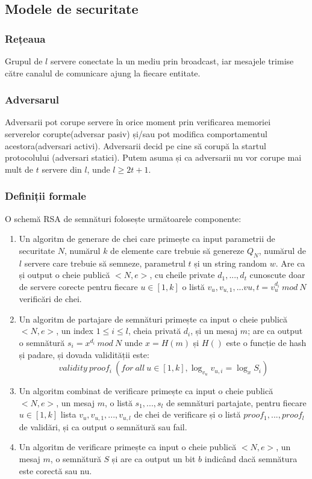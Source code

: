 \documentclass[12]{article}
\begin{document}
\subsection{Modele de securitate}
\subsubsection{Rețeaua}
Grupul de $l$ servere conectate la un mediu prin broadcast, iar mesajele trimise către canalul de comunicare ajung la fiecare entitate.
\subsubsection{Adversarul}
Adversarii pot corupe servere în orice moment prin verificarea memoriei serverelor corupte(adversar pasiv) și/sau pot modifica comportamentul acestora(adversari activi). Adversarii decid pe cine să corupă la startul protocolului (adversari statici). Putem asuma și ca adversarii nu vor corupe mai mult de $t$ servere din $l$, unde $l \geqslant 2t+1$.
\subsubsection{Definiții formale}
O schemă RSA de semnături folosește următoarele componente:
\begin{enumerate}
\item Un algoritm de generare de chei care primește ca input parametrii de securitate $N$, numărul $k$ de elemente care trebuie să genereze $Q_N$, numărul de $l$ servere care trebuie să semneze, parametrul $t$ și un string random $w$. Are ca și output o cheie publică $<N,e>$, cu cheile private $d_1,...,d_t$ cunoscute doar de servere corecte pentru fiecare $u \in [1,k]$ o listă $v_u,v_{u,1},...v{u,t}=v_{u}^{d_i} \ mod \ N$ verificări de chei. 
\item Un algoritm de partajare de semnături primește ca input o cheie publică $<N,e>$, un index $ 1\leqslant i \leqslant l$, cheia privată $d_i$, și un mesaj $m$; are ca output o semnătură $s_i = x^{d_i} \ mod \ N$ unde $x=H(m)$ și $H()$ este o funcție de hash și padare, și dovada validității este:
$$ validity \ proof_i \ (for \ all \ u \in [1,k], \log_{v_u} v_{u,i}=\log_x S_i)$$
\item Un algoritm combinat de verificare primește ca input o cheie publică $<N,e>$, un mesaj $m$, o listă $s_1,...,s_l$ de semnături partajate, pentru fiecare $u \in [1,k]$ lista $v_u,v_{u,1},...,v_{u,l}$ de chei de verificare și o listă $proof_1,...,proof_l$ de validări, și ca output o semnătură sau fail.
\item Un algoritm de verificare primește ca input o cheie publică $<N,e>$, un mesaj $m$, o semnătură $S$ și are ca output un bit $b$ indicând dacă semnătura este corectă sau nu.
\end{enumerate}
\end{document}
